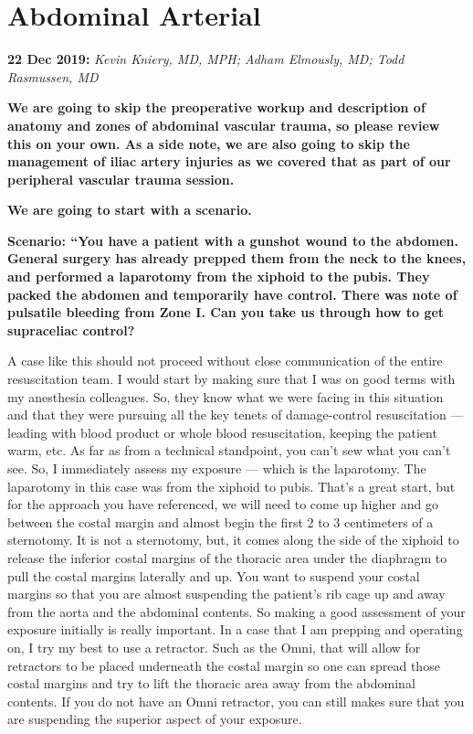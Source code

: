 \documentclass[
]{book}
\begin{document}
\hypertarget{abdominal-arterial}{%
\section{Abdominal Arterial}\label{abdominal-arterial}}

\textbf{22 Dec 2019:} \emph{Kevin Kniery, MD, MPH; Adham Elmously, MD; Todd
Rasmussen, MD}

\textbf{We are going to skip the preoperative workup and description of
anatomy and zones of abdominal vascular trauma, so please review this on
your own. As a side note, we are also going to skip the management of
iliac artery injuries as we covered that as part of our peripheral
vascular trauma session.}

\textbf{We are going to start with a scenario.}

\textbf{Scenario: ``You have a patient with a gunshot wound to the abdomen.
General surgery has already prepped them from the neck to the knees, and
performed a laparotomy from the xiphoid to the pubis. They packed the
abdomen and temporarily have control. There was note of pulsatile
bleeding from Zone I. Can you take us through how to get supraceliac
control?}

A case like this should not proceed without close communication of the entire
resuscitation team. I would start by making sure that I was on good terms with my anesthesia
colleagues. So, they know what we were facing in this situation
and that they were pursuing all the key tenets of damage-control
resuscitation --- leading with blood product or whole blood resuscitation, keeping the patient
warm, etc. As far as from a technical standpoint, you can't sew what you can't see. So, I immediately assess my exposure --- which is the laparotomy. The laparotomy in this case was
from the xiphoid to pubis. That's a great start, but for the approach you have referenced, we will need to come up higher and go between the costal margin and almost begin the first 2 to 3 centimeters of a sternotomy. It is not a sternotomy, but, it comes along the side of the xiphoid to release the inferior
costal margins of the thoracic area under the diaphragm to pull the costal margins laterally and up. You want to suspend your costal margins so that you are almost
suspending the patient's rib cage up and away from the aorta and the abdominal contents. So making a good assessment of your exposure initially is really important. In a case that I am prepping and operating on, I try my best to use a retractor. Such as the Omni, that will allow for retractors to be placed underneath the costal margin so one can
spread those costal margins and try to lift the thoracic area away from the abdominal contents. If you do not have an Omni retractor, you can still makes sure that you are suspending the superior aspect of your exposure.
\end{document}
